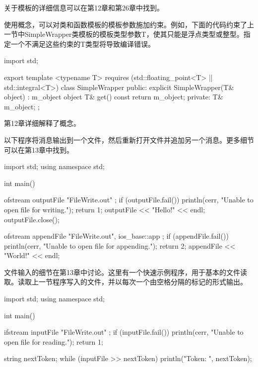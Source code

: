 关于模板的详细信息可以在第12章和第26章中找到。


使用概念，可以对类和函数模板的模板参数施加约束。例如，下面的代码约束了上一节中SimpleWrapper类模板的模板类型参数T，使其只能是浮点类型或整型。指定一个不满足这些约束的T类型将导致编译错误。

\begin{cpp}
import std;

export template <typename T> requires (std::floating_point<T> || std::integral<T>)
class SimpleWrapper
{
    public:
        explicit SimpleWrapper(T& object) : m_object { object } { }
        T& get() const { return m_object; }
    private:
        T& m_object;
};
\end{cpp}

第12章详细解释了概念。


以下程序将消息输出到一个文件，然后重新打开文件并追加另一个消息。更多细节可以在第13章中找到。

\begin{cpp}
import std;
using namespace std;

int main()
{
    ofstream outputFile { "FileWrite.out" };
    if (outputFile.fail()) {
        println(cerr, "Unable to open file for writing.");
        return 1;
    }
    outputFile << "Hello!" << endl;
    outputFile.close();

    ofstream appendFile { "FileWrite.out", ios_base::app };
    if (appendFile.fail()) {
        println(cerr, "Unable to open file for appending.");
        return 2;
    }
    appendFile << "World!" << endl;
}
\end{cpp}


文件输入的细节在第13章中讨论。这里有一个快速示例程序，用于基本的文件读取。读取上一节程序写入的文件，并以每次一个由空格分隔的标记的形式输出。

\begin{cpp}
import std;
using namespace std;

int main()
{
    ifstream inputFile { "FileWrite.out" };
    if (inputFile.fail()) {
        println(cerr, "Unable to open file for reading.");
        return 1;
    }

    string nextToken;
    while (inputFile >> nextToken) {
        println("Token: {}", nextToken);
    }
}
\end{cpp}

